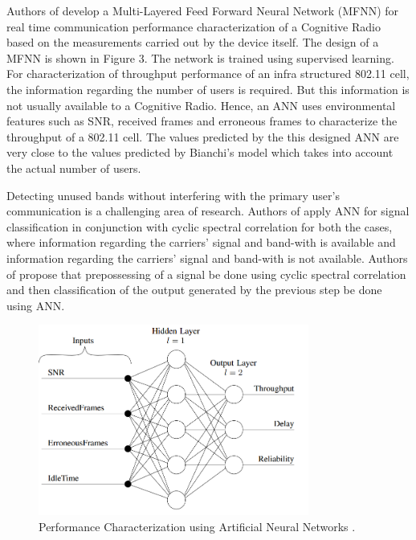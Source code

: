 \documentclass[conference]{IEEEtran}
\begin{document}
    Authors of \cite{8} develop a Multi-Layered Feed Forward Neural Network (MFNN) for real time communication performance characterization of a Cognitive Radio based on the measurements carried out by the device itself. The design of a MFNN is shown in Figure 3. The network is trained using supervised learning. For characterization of throughput performance of an infra structured 802.11 cell, the information regarding the number of users is required. But this information is not usually available to a Cognitive Radio. Hence, an ANN uses environmental features such as SNR, received frames and erroneous frames to characterize the throughput of a 802.11 cell. The values predicted by the this designed ANN are very close to the values predicted by Bianchi's model which takes into account the actual number of users.

    Detecting unused bands without interfering with the primary user's communication is a challenging area of research. Authors of \cite{7} apply ANN for signal classification in conjunction with cyclic spectral correlation for both the cases, where information regarding the carriers' signal and band-with is available and information regarding the carriers' signal and band-with is not available. Authors of \cite{7} propose that prepossessing of a signal be done using cyclic spectral correlation and then classification of the output generated by the previous step be done using ANN.  
    
\begin{figure}[!t]
\centering
\includegraphics[width=3.5in]{Figure_3}
\caption{Performance Characterization using Artificial Neural Networks \cite{8}.}
\label{fig_ann2}
\end{figure}
	
\end{document}
